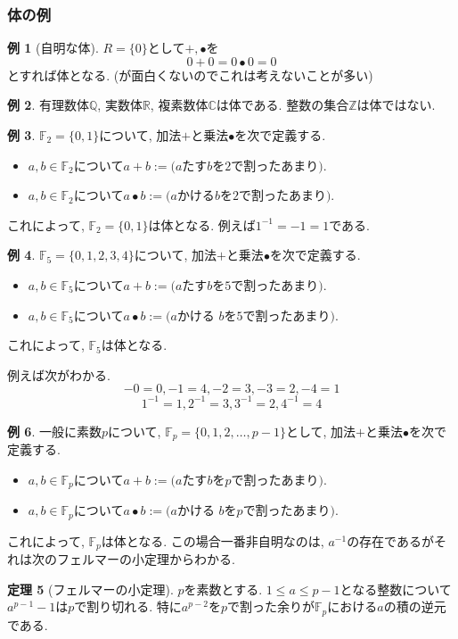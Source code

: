 \documentclass[dvipdfmx,a4paper,11pt]{article} %
\newcommand{\R}{\mathbb{R}}
\newcommand{\Z}{\mathbb{Z}}
\newcommand{\Q}{\mathbb{Q}}
\newcommand{\C}{\mathbb{C}}
\theoremstyle{definition}
\newtheorem{thm}{定理}
\newtheorem{exa}[thm]{例}
\begin{document}
  \subsubsection{体の例}
  
  \begin{exa}[自明な体]
  $R=\{0\}$として$+, \bullet$を
  $$
  0 + 0 = 0\bullet 0=0
  $$
  とすれば体となる. (が面白くないのでこれは考えないことが多い)
  \end{exa}
  
  \begin{exa}
  有理数体$\Q$, 実数体$\R$, 複素数体$\C$は体である. 
  整数の集合$\Z$は体ではない. 
  \end{exa}

  \begin{exa}
  $\mathbb{F}_2=\{0,1\}$について, 
  加法$+ $と乗法$\bullet$を次で定義する.
  \begin{itemize}
  \item $a, b \in \mathbb{F}_2$について$a+b:=\text{($a$たす$b$を2で割ったあまり)}$. 
\item $a, b \in \mathbb{F}_2$について$a\bullet b:=\text{($a$かける$b$を2で割ったあまり)}$. 
 \end{itemize}
これによって,   $\mathbb{F}_2=\{0,1\}$は体となる. 
例えば$1^{-1}=-1=1$である. 
  \end{exa}


  \begin{exa}
  $\mathbb{F}_5=\{0,1 ,2, 3, 4\}$について, 
  加法$+ $と乗法$\bullet$を次で定義する.
  \begin{itemize}
  \item $a, b \in \mathbb{F}_5$について$a+b:=\text{($a$たす$b$を5で割ったあまり)}$. 
\item $a, b \in \mathbb{F}_5$について$a\bullet b:=\text{($a$かける $b$を5で割ったあまり)}$. 
 \end{itemize}
これによって,   $\mathbb{F}_5$は体となる. 

例えば次がわかる. 
$$
-0=0, -1 =4, -2=3, -3=2, -4=1
$$
$$
1^{-1} =1, 2^{-1}=3, 3^{-1}=2, 4^{-1}=4
$$ 
  \end{exa}
  
  \begin{exa}
一般に素数$p$について, 
$\mathbb{F}_p=\{0,1 ,2, \ldots, p-1\}$として, 
  加法$+ $と乗法$\bullet$を次で定義する.
  \begin{itemize}
  \item $a, b \in \mathbb{F}_p$について$a+b:=\text{($a$たす$b$を$p$で割ったあまり)}$. 
\item $a, b \in \mathbb{F}_p$について$a\bullet b:=\text{($a$かける $b$を$p$で割ったあまり)}$. 
 \end{itemize}
これによって,   $\mathbb{F}_p$は体となる. 
この場合一番非自明なのは, $a^{-1}$の存在であるがそれは次のフェルマーの小定理からわかる.
\begin{thm}[フェルマーの小定理]
$p$を素数とする. $1 \le a \le p-1$となる整数について
$a^{p-1}-1$は$p$で割り切れる.
特に$a^{p-2}$を$p$で割った余りが$\mathbb{F}_p$における$a$の積の逆元である.
\end{thm}

  \end{exa}
\end{document}
